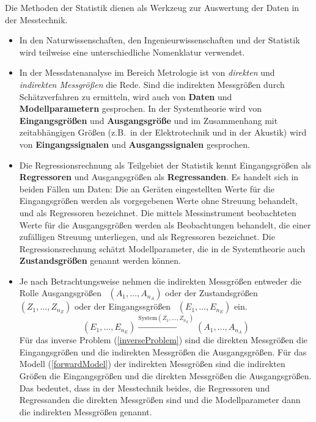 \documentclass[a4paper,12pt,DIV=15]{scrartcl}
\begin{document}
Die Methoden der Statistik dienen als Werkzeug zur Auswertung der Daten in der Messtechnik.
\begin{itemize}
	\item In den Naturwissenschaften, den Ingenieurwissenschaften und der Statistik wird
  teilweise eine unterschiedliche Nomenklatur verwendet.
	\item In der Messdatenanalyse im Bereich Metrologie ist von \textsl{direkten} 
		und \textsl{indirekten Messgrößen} die Rede. Sind die indirekten Messgrößen durch
		Schätzverfahren zu ermitteln, wird auch von \textbf{Daten} und \textbf{Modellparametern}
		gesprochen.
		In der Systemtheorie wird von \textbf{Eingangsgrößen} und \textbf{Ausgangsgröße}
		und im Zusammenhang mit zeitabhängigen Größen (z.B.\ in der Elektrotechnik und
		in der Akustik) wird von
		\textbf{Eingangssignalen} und \textbf{Ausgangssignalen} gesprochen. 
	\item Die Regressionsrechnung als Teilgebiet der Statistik kennt Eingangsgrößen als
		\textbf{Regressoren} und Ausgangsgrößen als \textbf{Regressanden}.
			Es handelt sich in beiden Fällen um Daten: Die an Geräten eingestellten Werte für die
			Eingangsgrößen werden als vorgegebenen Werte ohne Streuung behandelt, und als
			Regressoren bezeichnet. Die mittels Messinstrument beobachteten Werte für die Ausgangsgrößen
			werden als Beobachtungen behandelt, die einer zufälligen Streuung unterliegen, und
			als Regressoren bezeichnet. Die Regressionsrechnung schätzt Modellparameter, die in de
			Systemtheorie auch \textbf{Zustandsgrößen} genannt werden können.
	\item Je nach Betrachtungsweise nehmen die indirekten Messgrößen entweder
		die Rolle \glqq Ausgangsgrößen\grqq ~ $(A_1, \dots, A_{n_A})$ oder 
			der \glqq Zustandsgrößen\grqq ~ $(Z_1, \dots, Z_{n_Z})$
			oder der \glqq Eingangssgrößen\grqq ~ $(E_1, \dots, E_{n_E})$ ein.
\begin{equation}
(E_1, \dots, E_{n_E}) \xrightarrow{\mathrm{System} (Z_1, \dots, Z_{n_Z})} (A_1, \dots, A_{n_A})
\label{allgemeinSystem}
\end{equation}
			Für das inverse Problem (\ref{inverseProblem}) sind die direkten Messgrößen die Eingangsgrößen 
			und die indirekten Messgrößen die Ausgangsgrößen. Für das Modell (\ref{forwardModel})
			der indirekten Messgrößen sind die indirekten Größen die Eingangsgrößen und die
			direkten Messgrößen die Ausgangsgrößen. Das bedeutet, dass in
			der Messtechnik beides, die Regressoren und Regressanden die direkten 
			Messgrößen sind und die Modellparameter dann die indirekten Messgrößen genannt.
\end{itemize}
\end{document}
